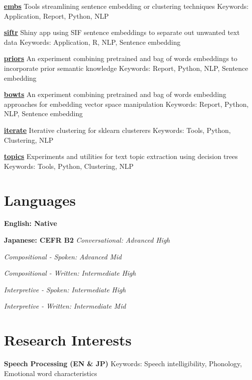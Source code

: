 \documentclass[a4paper,9pt]{extarticle}
\begin{document}
\noindent
\textbf{\href{https://github.com/ryancahildebrandt/embs}{embs}}
Tools streamlining sentence embedding or clustering techniques
Keywords: Application, Report, Python, NLP

\noindent
\textbf{\href{https://github.com/ryancahildebrandt/siftr}{siftr}}
Shiny app using SIF sentence embeddings to separate out unwanted text data
Keywords: Application, R, NLP, Sentence embedding

\noindent
\textbf{\href{https://github.com/ryancahildebrandt/priors}{priors}}
An experiment combining pretrained and bag of words embeddings to incorporate prior semantic knowledge
Keywords: Report, Python, NLP, Sentence embedding

\noindent
\textbf{\href{https://github.com/ryancahildebrandt/bowts}{bowts}}
An experiment combining pretrained and bag of words embedding approaches for embedding vector space manipulation
Keywords: Report, Python, NLP, Sentence embedding

\noindent
\textbf{\href{https://github.com/ryancahildebrandt/iterate}{iterate}}
Iterative clustering for sklearn clusterers
Keywords: Tools, Python, Clustering, NLP

\noindent
\textbf{\href{https://github.com/ryancahildebrandt/topics}{topics}}
Experiments and utilities for text topic extraction using decision trees
Keywords: Tools, Python, Clustering, NLP

\section*{Languages}

\noindent
\textbf{English: Native}

\noindent
\textbf{Japanese: CEFR B2}
\textit{Conversational: Advanced High}

\textit{Compositional - Spoken: Advanced Mid}

\textit{Compositional - Written: Intermediate High}

\textit{Interpretive - Spoken: Intermediate High}

\textit{Interpretive - Written: Intermediate Mid}

\section*{Research Interests}

\noindent
\textbf{Speech Processing (EN \& JP)}
Keywords: Speech intelligibility, Phonology, Emotional word characteristics
\end{document}
